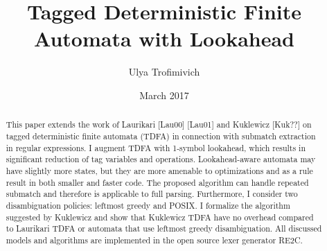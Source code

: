 \documentclass{article}
\title{Tagged Deterministic Finite Automata with Lookahead}
\author{Ulya Trofimivich}
\date{March 2017}
\theoremstyle{definition}
\begin{document}
\maketitle

\begin{abstract}
\noindent
This paper extends the work of Laurikari [Lau00] [Lau01] and Kuklewicz [Kuk??] on tagged deterministic finite automata (TDFA)
in connection with submatch extraction in regular expressions.
I augment TDFA with 1-symbol lookahead, which results in significant reduction of tag variables and operations.
Lookahead-aware automata may have slightly more states, but they are more amenable to optimizations and as a rule result in both smaller and faster code.
The proposed algorithm can handle repeated submatch and therefore is applicable to full parsing.
Furthermore, I consider two disambiguation policies: leftmost greedy and POSIX.
I formalize the algorithm suggested by Kuklewicz
and show that Kuklewicz TDFA have no overhead compared to Laurikari TDFA or automata that use leftmost greedy disambiguation.
All discussed models and algorithms are implemented in the open source lexer generator RE2C.
\end{abstract}
\end{document}
